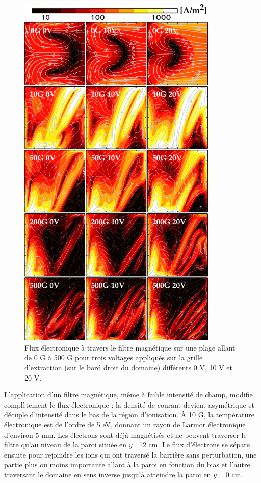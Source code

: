 \begin{refsection}
 \begin{figure}[!htbp]
	\centering
	\includegraphics[width=0.85\textwidth]{figures/4-pegasesfluxElectronique.pdf}
	{\caption{Flux électronique à travers le filtre magnétique sur une plage
	allant de 0 G à 500 G pour trois voltages appliqués sur la grille
	d'extraction (sur le bord droit du domaine) différents 0 V, 10 V et 20 V.}
	\label{4-pegasesfluxElectronique}}
	\end{figure}
	
L'application d'un filtre magnétique, même à faible intensité de champ, modifie
complètement le flux électronique : la densité de courant devient asymétrique et
décuple d'intensité dans le bas de la région d'ionisation. À 10 G, la
température électronique est de l'ordre de 5 eV, donnant un rayon de Larmor
électronique d'environ 5 mm. Les électrons sont déjà magnétisés et ne peuvent
traverser le filtre qu'au niveau de la paroi située en $y\,$=12 cm. Le flux
d'électrons se sépare ensuite pour rejoindre les ions qui ont traversé la
barrière sans perturbation, une partie plus ou moins importante allant à la
paroi en fonction du bias et l'autre traversant le domaine en sens inverse
jusqu'à atteindre la paroi en $y\,$= 0 cm.


\end{refsection}
